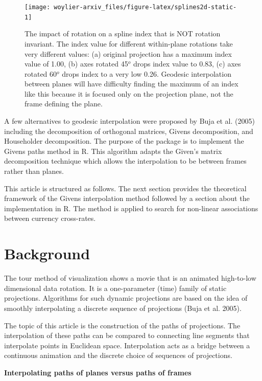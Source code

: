 \documentclass{article}
\begin{document}
\begin{figure}
\texttt{[image: woylier-arxiv\_files/figure-latex/splines2d-static-1]} \caption{The impact of rotation on a spline index that is NOT rotation invariant. The index value for different within-plane rotations take very different values: (a) original projection has a maximum index value of 1.00, (b) axes rotated 45$^o$ drops index value to 0.83, (c) axes rotated 60$^o$ drops index to a very low 0.26. Geodesic interpolation between planes will have difficulty finding the maximum of an index like this because it is focused only on the projection plane, not the frame defining the plane.}\label{fig:splines2d-static}
\end{figure}

A few alternatives to geodesic interpolation were proposed by Buja et
al. (2005) including the decomposition of orthogonal matrices, Givens
decomposition, and Householder decomposition. The purpose of the
 package is to implement the Givens paths method in R.
This algorithm adapts the Given's matrix decomposition technique which
allows the interpolation to be between frames rather than planes.

This article is structured as follows. The next section provides the
theoretical framework of the Givens interpolation method followed by a
section about the implementation in R. The method is applied to search
for non-linear associations between currency cross-rates.

\hypertarget{background}{%
\section{Background}\label{background}}

The tour method of visualization shows a movie that is an animated
high-to-low dimensional data rotation. It is a one-parameter (time)
family of static projections. Algorithms for such dynamic projections
are based on the idea of smoothly interpolating a discrete sequence of
projections (Buja et al. 2005).

The topic of this article is the construction of the paths of
projections. The interpolation of these paths can be compared to
connecting line segments that interpolate points in Euclidean space.
Interpolation acts as a bridge between a continuous animation and the
discrete choice of sequences of projections.

\textbf{Interpolating paths of planes versus paths of frames}
\end{document}
